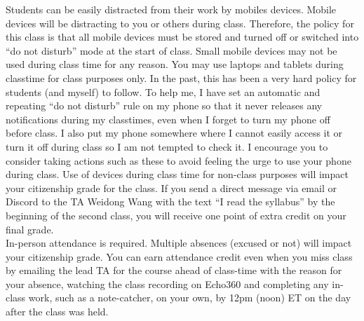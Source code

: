 \documentclass[10pt]{article}
\begin{document}
Students can be easily distracted from their work by mobiles devices. Mobile devices will be distracting to you or others during class. Therefore, the policy for this class is that all mobile devices must be stored and turned off or switched into ``do not disturb'' mode at the start of class. Small mobile devices may not be used during class time for any reason. %
You may use laptops and tablets during classtime for class purposes only. In the past, this has been a very hard policy for students (and myself) to follow. To help me, I have set an automatic and repeating ``do not disturb'' rule on my phone so that it never releases any notifications during my classtimes, even when I forget to turn my phone off before class. I also put my phone somewhere where I cannot easily access it or turn it off during class so I am not tempted to check it. I encourage you to consider taking actions such as these to avoid feeling the urge to use your phone during class.
Use of devices during class time for non-class purposes will impact your citizenship grade for the class.
If you send a direct message via email or Discord to the TA Weidong Wang with the text ``I read the syllabus'' by the beginning of the second class, you will receive one point of extra credit on your final grade. \\


 In-person attendance is required. Multiple absences (excused or not) will impact your citizenship grade. You can earn attendance credit even when you miss class by emailing the lead TA for the course ahead of class-time with the reason for your absence, watching the class recording on Echo360 and completing any in-class work, such as a note-catcher, on your own, by 12pm (noon) ET on the day after the class was held. \\
\end{document}
